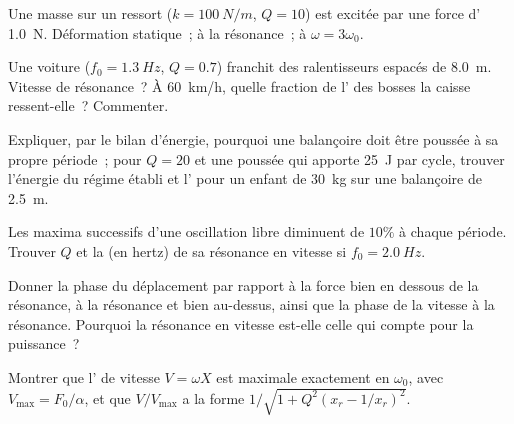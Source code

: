 \begin{exercise}[$\star$]\label{exo:b1:oscillators-resonance:4}
Une masse sur un ressort ($k = \qty{100}{N/m}$, $Q = 10$) est excitée
par une force d' \qty{1.0}{N}. Déformation statique~; 
à la résonance~;  à $\omega = 3\omega_0$.
\end{exercise}

\begin{exercise}[$\star\star$]\label{exo:b1:oscillators-resonance:5}
Une voiture ($f_0 = \qty{1.3}{Hz}$, $Q = 0.7$) franchit des ralentisseurs
espacés de \qty{8.0}{m}. Vitesse de résonance~? À \qty{60}{km/h}, quelle
fraction de l' des bosses la caisse ressent-elle~? Commenter.
\end{exercise}

\begin{exercise}[$\star\star$]\label{exo:b1:oscillators-resonance:6}
Expliquer, par le bilan d'énergie, pourquoi une balançoire doit être
poussée à sa propre période~; pour $Q = 20$ et une poussée qui apporte
\qty{25}{J} par cycle, trouver l'énergie du régime établi et l'
pour un enfant de \qty{30}{kg} sur une balançoire de \qty{2.5}{m}.
\end{exercise}

\begin{exercise}[$\star\star$]\label{exo:b1:oscillators-resonance:7}
Les maxima successifs d'une oscillation libre diminuent de $10\%$ à
chaque période. Trouver $Q$ et la  (en hertz) de sa
résonance en vitesse si $f_0 = \qty{2.0}{Hz}$.
\end{exercise}

\begin{exercise}[$\star\star$]\label{exo:b1:oscillators-resonance:8}
Donner la phase du déplacement par rapport à la force bien en dessous de
la résonance, à la résonance et bien au-dessus, ainsi que la phase de la
vitesse à la résonance. Pourquoi la résonance en vitesse est-elle celle
qui compte pour la puissance~?
\end{exercise}

\begin{exercise}[$\star\star$]\label{exo:b1:oscillators-resonance:9}
Montrer que l' de vitesse $V = \omega X$ est maximale exactement
en $\omega_0$, avec $V_{\max} = F_0/\alpha$, et que $V/V_{\max}$ a la
forme $1/\sqrt{1 + Q^2(x_r - 1/x_r)^2}$.
\end{exercise}

